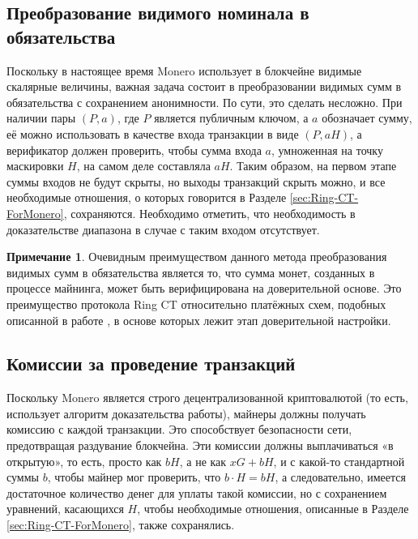 \documentclass{mrl}
\theoremstyle{definition}
\numberwithin{thm}{section}
\newtheorem{rem}[thm]{Примечание}
\begin{document}
\subsection{Преобразование видимого номинала в обязательства}
\label{conversion}

Поскольку в настоящее время Monero использует в блокчейне видимые скалярные величины, важная задача состоит в преобразовании видимых сумм в обязательства с сохранением анонимности. По сути, это сделать несложно. При наличии пары $(P, a)$, где $P$ является публичным ключом, а $a$ обозначает сумму, её можно использовать в качестве входа транзакции в виде $(P, aH)$, а верификатор должен проверить, чтобы сумма входа $a$, умноженная на точку маскировки $H$, на самом деле составляла $aH$. Таким образом, на первом этапе суммы входов не будут скрыты, но выходы транзакций скрыть можно, и все необходимые отношения, о которых говорится в Разделе \ref{sec:Ring-CT-ForMonero}, сохраняются. Необходимо отметить, что необходимость в доказательстве диапазона в случае с таким входом отсутствует.
\begin{rem}
Очевидным преимуществом данного метода преобразования видимых сумм в обязательства является то, что сумма монет, созданных в процессе майнинга, может быть верифицирована на доверительной основе. Это преимущество протокола Ring CT относительно платёжных схем, подобных описанной в работе \cite{Z}, в основе которых лежит этап доверительной настройки.
\end{rem}
\subsection{Комиссии за проведение транзакций}
Поскольку Monero является строго децентрализованной криптовалютой (то есть, использует алгоритм доказательства работы), майнеры должны получать комиссию с каждой транзакции. Это способствует безопасности сети, предотвращая раздувание блокчейна. Эти комиссии должны выплачиваться «в открытую», то есть, просто как $bH$, а не как $xG+bH$, и с какой-то стандартной суммы $b$, чтобы майнер мог проверить, что $b\cdot H = bH$, а следовательно, имеется достаточное количество денег для уплаты такой комиссии, но с сохранением уравнений, касающихся $H$, чтобы необходимые отношения, описанные в Разделе \ref{sec:Ring-CT-ForMonero}, также сохранялись.
\end{document}
